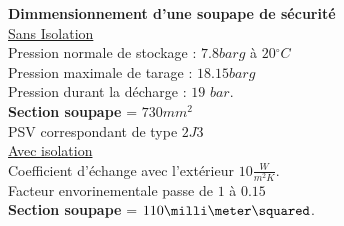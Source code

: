 \documentclass[landscape,a0paper,fontscale=0.285]{baposter} %
\begin{document}
\begin{poster}
{\begin{multicols}{2}
\textbf{Dimmensionnement d'une soupape de sécurité}\\

\underline {Sans Isolation}\\
Pression normale de stockage : $7.8 barg$ à $20\ensuremath{^\circ}C$ \\

Pression maximale de tarage : $18.15barg$\\

Pression durant la décharge : $19$ $bar$. \\

\textbf{Section soupape} = $730mm^{2}$ \\
PSV correspondant de type $2J3$\\
 
\underline{Avec isolation}\\

Coefficient d'échange avec l'extérieur  $10\frac{W}{m^{2}K}$. \\

Facteur envorinementale passe de $1$ à $0.15$\\

\textbf{Section soupape} = $110{\milli\meter\squared}$. 





\end{multicols}}
\end{poster}
\end{document}
